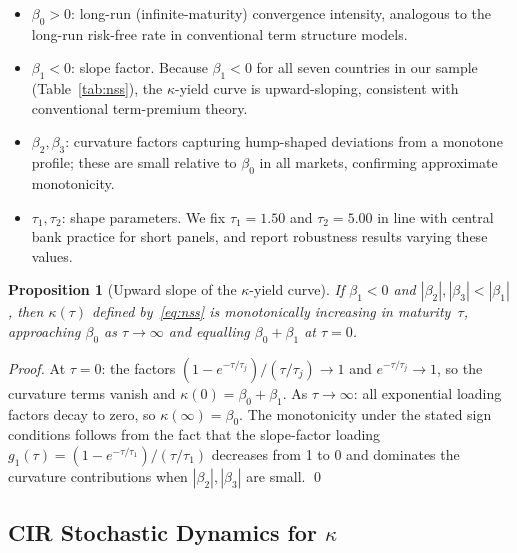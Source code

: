 \documentclass[12pt]{article}
\theoremstyle{plain}
\newtheorem{proposition}{Proposition}[section]
\theoremstyle{definition}
\theoremstyle{remark}
\begin{document}
\begin{itemize}[noitemsep]
\item $\beta_0 > 0$: long-run (infinite-maturity) convergence intensity,
  analogous to the long-run risk-free rate in conventional term structure models.

\item $\beta_1 < 0$: slope factor. Because $\beta_1 < 0$ for all seven
  countries in our sample (Table~\ref{tab:nss}), the $\kappa$-yield curve is
  upward-sloping, consistent with conventional term-premium theory.

\item $\beta_2, \beta_3$: curvature factors capturing hump-shaped deviations
  from a monotone profile; these are small relative to $\beta_0$ in all
  markets, confirming approximate monotonicity.

\item $\tau_1, \tau_2$: shape parameters. We fix $\tau_1 = 1.50$ and
  $\tau_2 = 5.00$ in line with central bank practice for short panels, and
  report robustness results varying these values.
\end{itemize}

\begin{proposition}[Upward slope of the $\kappa$-yield curve]
\label{prop:slope}
If $\beta_1 < 0$ and $|\beta_2|, |\beta_3| < |\beta_1|$, then
$\kappa(\tau)$ defined by~\eqref{eq:nss} is monotonically increasing in
maturity~$\tau$, approaching $\beta_0$ as $\tau \to \infty$ and equalling
$\beta_0 + \beta_1$ at $\tau = 0$.
\end{proposition}

\begin{proof}
At $\tau = 0$: the factors $(1-e^{-\tau/\tau_j})/(\tau/\tau_j) \to 1$ and
$e^{-\tau/\tau_j} \to 1$, so the curvature terms vanish and
$\kappa(0) = \beta_0 + \beta_1$. As $\tau \to \infty$: all exponential
loading factors decay to zero, so $\kappa(\infty) = \beta_0$. The monotonicity
under the stated sign conditions follows from the fact that the slope-factor
loading $g_1(\tau) = (1-e^{-\tau/\tau_1})/(\tau/\tau_1)$ decreases from 1 to
0 and dominates the curvature contributions when $|\beta_2|,|\beta_3|$ are
small. \qed
\end{proof}

\subsection{CIR Stochastic Dynamics for \texorpdfstring{$\kappa$}{kappa}}
\end{document}
